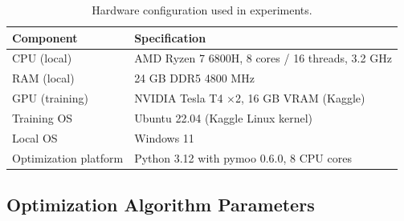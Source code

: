 \begin{table}[htbp]
    \centering
    \caption{Hardware configuration used in experiments.}
    \label{tab:hardware}
    \begin{tabular}{ll}
        \toprule
        Component     & Specification \\
        \midrule
        CPU (local)            & AMD Ryzen 7 6800H, 8 cores / 16 threads, 3.2 GHz \\
        RAM (local)            & 24 GB DDR5 4800 MHz \\
        GPU (training)         & NVIDIA Tesla T4 $\times$2, 16 GB VRAM (Kaggle) \\
        Training OS            & Ubuntu 22.04 (Kaggle Linux kernel) \\
        Local OS               & Windows 11 \\
        Optimization platform  & Python 3.12 with pymoo 0.6.0, 8 CPU cores \\
        \bottomrule
    \end{tabular}
\end{table}

\subsection{Optimization Algorithm Parameters}

